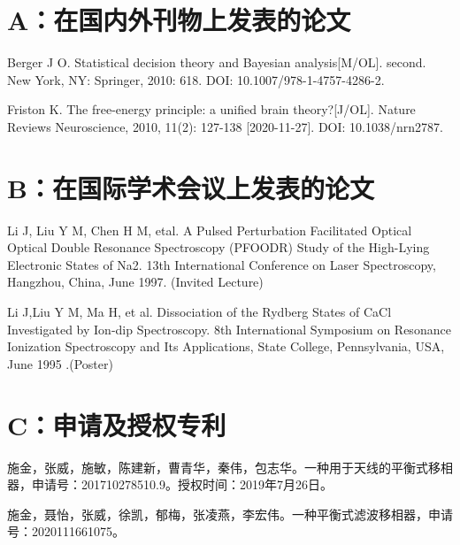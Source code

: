 %
\begin{achievement}
%
\section*{A：在国内外刊物上发表的论文}

{
\begin{backitem}
\item Berger J O. Statistical decision theory and Bayesian analysis[M/OL]. second. New York, NY: Springer, 2010: 618. DOI: 10.1007/978-1-4757-4286-2.
\item Friston K. The free-energy principle: a unified brain theory?[J/OL]. Nature Reviews Neuroscience, 2010, 11(2): 127-138 [2020-11-27]. DOI: 10.1038/nrn2787.
\end{backitem}
}
%
\section*{B：在国际学术会议上发表的论文}

{
\begin{backitem}
\item Li J, Liu Y M, Chen H M, etal. A Pulsed Perturbation Facilitated Optical Optical Double Resonance Spectroscopy (PFOODR) Study of the High-Lying Electronic States of Na2. 13th International Conference on Laser Spectroscopy, Hangzhou, China, June 1997. (Invited Lecture)
\item Li J,Liu Y M, Ma H, et al. Dissociation of the Rydberg States of CaCl Investigated by Ion-dip Spectroscopy. 8th International Symposium on Resonance Ionization Spectroscopy and Its Applications, State College, Pennsylvania, USA, June 1995 .(Poster)
\end{backitem}
}
%
\section*{C：申请及授权专利}
{
\begin{backitem}
\item 施金，张威，施敏，陈建新，曹青华，秦伟，包志华。一种用于天线的平衡式移相器，申请号：201710278510.9。授权时间：2019年7月26日。
\item 施金，聂怡，张威，徐凯，郁梅，张凌燕，李宏伟。一种平衡式滤波移相器，申请号：2020111661075。
\end{backitem}
}
%

\end{achievement}
